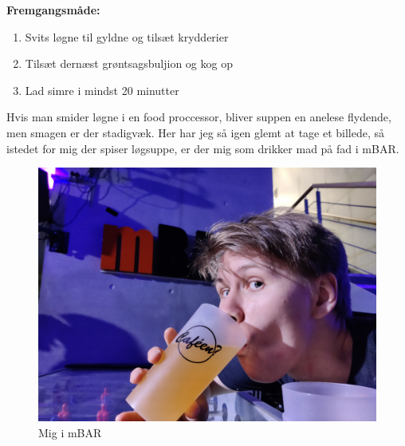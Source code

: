 \documentclass{book}
\begin{document}
\begin{minipage}[t]{0.5\textwidth}
\textbf{Fremgangsmåde:}
\begin{enumerate}
    \item Svits løgne til gyldne og tilsæt krydderier
    \item Tilsæt dernæst grøntsagsbuljion og kog op
    \item Lad simre i mindst 20 minutter
\end{enumerate}
\end{minipage}
Hvis man smider løgne i en food proccessor, bliver suppen en anelese flydende, men smagen er der stadigvæk.
\newpage 
Her har jeg så igen glemt at tage et billede, så istedet for mig der spiser løgsuppe, er der mig som drikker mad på fad i mBAR.
\begin{figure}
    \centering
    \includegraphics[width=0.5\linewidth]{mBAR.jpg}
    \caption{Mig i mBAR}
    
\end{figure}
\newpage 
\end{document}

